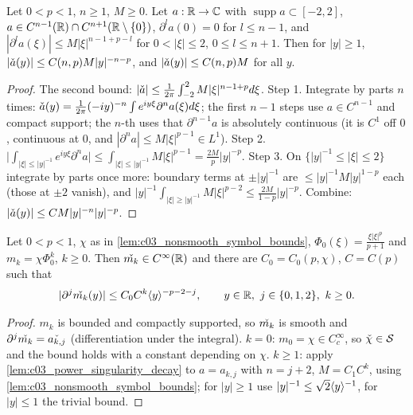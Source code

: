 \begin{lemma}
  \label{lem:c03_power_singularity_decay}
  Let $0<p<1$, $n\ge1$, $M\ge0$. Let $a:\R\to\C$ with $\operatorname{supp}a\subset[-2,2]$, $a\in C^{n-1}(\R)\cap C^{n+1}(\R\setminus\{0\})$, $\partial^la(0)=0$ for $l\le n-1$, and
  $|\partial^la(\xi)|\le M|\xi|^{n-1+p-l}$ for $0<|\xi|\le2$, $0\le l\le n+1$. Then for $|y|\ge1$, $|\widecheck a(y)|\le C(n,p)M|y|^{-n-p}$, and $|\widecheck a(y)|\le C(n,p)M$ for all $y$.
\end{lemma}
\begin{proof}
  The second bound: $|\widecheck a|\le\frac1{2\pi}\int_{-2}^2M|\xi|^{n-1+p}d\xi$.
  Step 1. Integrate by parts $n$ times: $\widecheck a(y)=\frac{1}{2\pi}(-iy)^{-n}\int e^{iy\xi}\partial^na(\xi)d\xi$; the first $n-1$ steps use $a\in C^{n-1}$ and compact support; the $n$-th uses that $\partial^{n-1}a$ is absolutely continuous (it is $C^1$ off $0$, continuous at $0$, and $|\partial^na|\le M|\xi|^{p-1}\in L^1$).
  Step 2. $\bigl|\int_{|\xi|\le|y|^{-1}}e^{iy\xi}\partial^na\bigr|\le\int_{|\xi|\le|y|^{-1}}M|\xi|^{p-1}=\frac{2M}{p}|y|^{-p}$.
  Step 3. On $\{|y|^{-1}\le|\xi|\le2\}$ integrate by parts once more: boundary terms at $\pm|y|^{-1}$ are $\le|y|^{-1}M|y|^{1-p}$ each (those at $\pm2$ vanish), and $|y|^{-1}\int_{|\xi|\ge|y|^{-1}}M|\xi|^{p-2}\le\frac{2M}{1-p}|y|^{-p}$.
  Combine: $|\widecheck a(y)|\le C M|y|^{-n}|y|^{-p}$.
\end{proof}

\begin{proposition}
  \label{prop:appendix_nonsmooth_fourier_inverse}
  Let $0<p<1$, $\chi$ as in \cref{lem:c03_nonsmooth_symbol_bounds}, $\Phi_0(\xi)=\frac{\xi|\xi|^p}{p+1}$ and $m_k=\chi\Phi_0^k$, $k\ge0$. Then $\widecheck{m_k}\in C^\infty(\R)$ and there are $C_0=C_0(p,\chi)$, $C=C(p)$ such that
  \[
    |\partial^j\widecheck{m_k}(y)|\le C_0C^k\ang y^{-p-2-j},\qquad y\in\R,\ j\in\{0,1,2\},\ k\ge0 .
  \]
\end{proposition}
\begin{proof}
  $m_k$ is bounded and compactly supported, so $\widecheck{m_k}$ is smooth and $\partial^j\widecheck{m_k}=\widecheck{a_{k,j}}$ (differentiation under the integral).
  $k=0$: $m_0=\chi\in C_c^\infty$, so $\widecheck{\chi}\in\mc S$ and the bound holds with a constant depending on $\chi$.
  $k\ge1$: apply \cref{lem:c03_power_singularity_decay} to $a=a_{k,j}$ with $n=j+2$, $M=C_1C^k$, using \cref{lem:c03_nonsmooth_symbol_bounds}; for $|y|\ge1$ use $|y|^{-1}\le\sqrt2\ang y^{-1}$, for $|y|\le1$ the trivial bound.
\end{proof}

